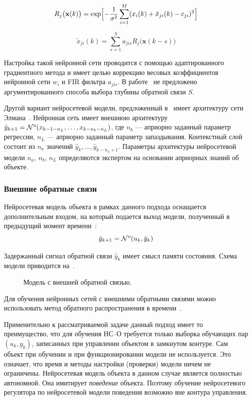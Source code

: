 $$
R_j\bigl(\mathbf{x}(k)\bigr)=
   \exp\Bigl[-\frac{1}{\sigma^2}\sum\limits_{i=1}^M
             (x_i(k)+\tilde{x}_{ji}(k)-c_{ji})^2\Bigr]
$$

$$
\tilde{x}_{ji}(k)=\sum\limits_{s=1}^S a_{jis}R_j\bigl(\mathbf{x}(k-s)\bigr)
$$

Настройка такой нейронной сети проводится с помощью адаптированного
градиентного метода и имеет целью коррекцию весовых коэффициентов
нейронной сети $w_i$ и FIR фильтра $a_{jis}$.  В
работе~\cite{boquete99} не предложено аргументированного способа
выбора глубины обратной связи $S$.

Другой вариант нейросетевой модели, предложенный в~\cite{benne00}
имеет архитектуру сети Элмана~\cite{golovko01}.  Нейронная сеть имеет
внешнюю архитектуру
$\hat{y}_{k+1}=\mathcal{N}^o(x_{k-1-n_L},\ldots,x_{k-n_b-n_L})$, где $n_b$ ---
априорно заданный параметр регрессии, $n_L$ --- априорно заданный
параметр запаздывания.  Контекстный слой состоит из $n_a$ значений
$\hat{y}_{k},\ldots,\hat{y}_{k-n_a+1}$.  Параметры архитектуры
нейросетевой модели $n_a$, $n_b$, $n_L$ определяются экспертом на
основании априорных знаний об объекте.

\subsubsection{Внешние обратные связи}

Нейросетевая модель объекта в рамках данного подхода оснащается
дополнительным входом, на который подается выход модели,
полученный в предыдущий момент времени~\cite{sigom00}:
$$ \hat{y}_{k+1}=\mathcal{N}^o(u_k, \hat{y}_k) $$

Задержанный сигнал обратной связи $\hat{y}_k$ имеет смысл памяти
состояния.  Схема модели приводится на~.

\begin{figure}[h]
  \centering
  
  \caption{Модель с внешней обратной связью.}
  \label{fig:nnp-feedback}
\end{figure}

Для обучения нейронных сетей с внешними обратными связями можно
использовать метод обратного распространения в
времени~\cite{gibb96,sigom00}.

Применительно к рассматриваемой задаче данный подход имеет то
преимущество, что для обучения НС--О требуется только выборка
обучающих пар $(u_k, y_k)$, записанных при управлении объектом в
замкнутом контуре.  Сам объект при обучении и при функционировании
модели не используется.  Это означает, что время и методы настройки
(проверки) модели ничем не ограничены.  Нейросетевая модель объекта в
данном случае является полностью автономной.  Она имитирует {\it
поведение }объекта.  Поэтому обучение нейросетевого регулятора по
нейросетевой модели поведения возможно вне контура управления.

